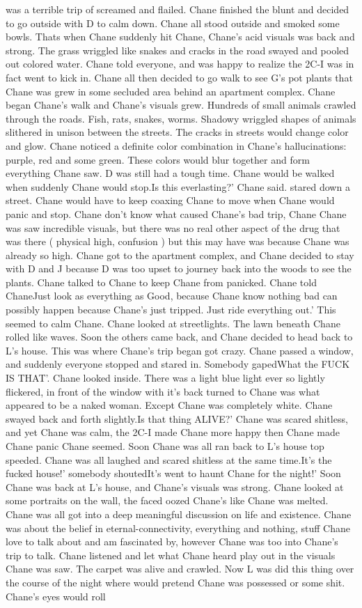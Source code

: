 \documentclass[12pt]{book}
\begin{document}
was a terrible trip of screamed and flailed. Chane finished the blunt and decided to go outside with D to calm down. Chane all stood outside and smoked some bowls. Thats when Chane suddenly hit Chane, Chane's acid visuals was back and strong. The grass wriggled like snakes and cracks in the road swayed and pooled out colored water. Chane told everyone, and was happy to realize the 2C-I was in fact went to kick in. Chane all then decided to go walk to see G's pot plants that Chane was grew in some secluded area behind an apartment complex. Chane began Chane's walk and Chane's visuals grew. Hundreds of small animals crawled through the roads. Fish, rats, snakes, worms. Shadowy wriggled shapes of animals slithered in unison between the streets. The cracks in streets would change color and glow. Chane noticed a definite color combination in Chane's hallucinations: purple, red and some green. These colors would blur together and form everything Chane saw. D was still had a tough time. Chane would be walked when suddenly Chane would stop.Is this everlasting?' Chane said. stared down a street. Chane would have to keep coaxing Chane to move when Chane would panic and stop. Chane don't know what caused Chane's bad trip, Chane Chane was saw incredible visuals, but there was no real other aspect of the drug that was there ( physical high, confusion ) but this may have was because Chane was already so high. Chane got to the apartment complex, and Chane decided to stay with D and J because D was too upset to journey back into the woods to see the plants. Chane talked to Chane to keep Chane from panicked. Chane told ChaneJust look as everything as Good, because Chane know nothing bad can possibly happen because Chane's just tripped. Just ride everything out.' This seemed to calm Chane. Chane looked at streetlights. The lawn beneath Chane rolled like waves. Soon the others came back, and Chane decided to head back to L's house. This was where Chane's trip began got crazy. Chane passed a window, and suddenly everyone stopped and stared in. Somebody gapedWhat the FUCK IS THAT'. Chane looked inside. There was a light blue light ever so lightly flickered, in front of the window with it's back turned to Chane was what appeared to be a naked woman. Except Chane was completely white. Chane swayed back and forth slightly.Is that thing ALIVE?' Chane was scared shitless, and yet Chane was calm, the 2C-I made Chane more happy then Chane made Chane panic Chane seemed. Soon Chane was all ran back to L's house top speeded. Chane was all laughed and scared shitless at the same time.It's the fucked house!' somebody shoutedIt's went to haunt Chane for the night!' Soon Chane was back at L's house, and Chane's visuals was strong. Chane looked at some portraits on the wall, the faced oozed Chane's like Chane was melted. Chane was all got into a deep meaningful discussion on life and existence. Chane was about the belief in eternal-connectivity, everything and nothing, stuff Chane love to talk about and am fascinated by, however Chane was too into Chane's trip to talk. Chane listened and let what Chane heard play out in the visuals Chane was saw. The carpet was alive and crawled. Now L was did this thing over the course of the night where would pretend Chane was possessed or some shit. Chane's eyes would roll 
\end{document}
